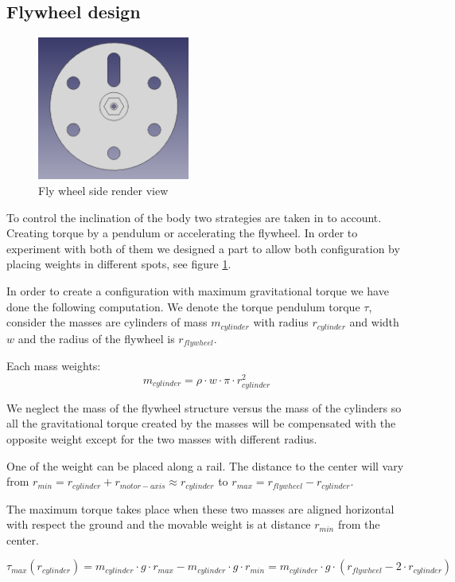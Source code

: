 \subsection{Flywheel design}
\begin{figure}
	\centering
	\includegraphics[width=5cm]{img/fly_wheel_side.png}
	\caption{Fly wheel side render view}
	\label{fig:Fly wheel side render view}
\end{figure}

To control the inclination of the body two strategies are taken in to account.
Creating torque by a pendulum or accelerating the flywheel.
In order to experiment with both of them we designed a part to allow
 both configuration by placing weights in different spots, see figure
 \ref{fig:Fly wheel side render view}.

In order to create a configuration with maximum gravitational torque
we have done the following computation. We denote the torque pendulum
torque $\tau$, consider the masses are cylinders of mass $m_{cylinder}$
with radius $r_{cylinder}$ and width $w$ and the radius of the flywheel is $r_{flywheel}$.

Each mass weights:
\[ m_{cylinder} = \rho \cdot w \cdot \pi \cdot r_{cylinder}^2 \]

We neglect the mass of the flywheel structure versus the mass of the cylinders so
all the gravitational torque created by the masses will be compensated with the
opposite weight except for the two masses with different radius.

One of the weight can be placed along a rail. The distance to the center will
vary from $r_{min} = r_{cylinder} + r_{motor-axis} \approx r_{cylinder} $ to $r_{max} = r_{flywheel} - r_{cylinder}$. 

The maximum torque takes place when these two masses are aligned horizontal with respect the ground and the movable weight is at distance $r_{min}$ from the center.

\[ \tau _{max} (r_{cylinder}) =  m_{cylinder} \cdot g \cdot r_{max} -  m_{cylinder} \cdot g \cdot r_{min} =
 m_{cylinder}\cdot g \cdot (r_{flywheel} - 2 \cdot r_{cylinder}) \]

